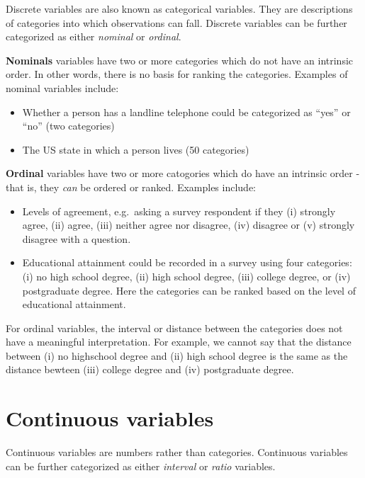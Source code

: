 \documentclass[
  12pt,
]{krantz}
\providecommand{\tightlist}{%
  \setlength{\itemsep}{0pt}\setlength{\parskip}{0pt}}
\begin{document}
Discrete variables are also known as categorical variables. They are descriptions of categories into which observations can fall. Discrete variables can be further categorized as either \emph{nominal} or \emph{ordinal}.

\textbf{Nominals} variables have two or more categories which do not have an intrinsic order. In other words, there is no basis for ranking the categories. Examples of nominal variables include:

\begin{itemize}
\tightlist
\item
  Whether a person has a landline telephone could be categorized as ``yes'' or ``no'' (two categories)
\item
  The US state in which a person lives (50 categories)
\end{itemize}

\textbf{Ordinal} variables have two or more catogories which do have an intrinsic order - that is, they \emph{can} be ordered or ranked. Examples include:

\begin{itemize}
\tightlist
\item
  Levels of agreement, e.g.~asking a survey respondent if they (i) strongly agree, (ii) agree, (iii) neither agree nor disagree, (iv) disagree or (v) strongly disagree with a question.
\item
  Educational attainment could be recorded in a survey using four categories: (i) no high school degree, (ii) high school degree, (iii) college degree, or (iv) postgraduate degree. Here the categories can be ranked based on the level of educational attainment.
\end{itemize}

For ordinal variables, the interval or distance between the categories does not have a meaningful interpretation. For example, we cannot say that the distance between (i) no highschool degree and (ii) high school degree is the same as the distance bewteen (iii) college degree and (iv) postgraduate degree.

\hypertarget{continuous-variables}{%
\section{Continuous variables}\label{continuous-variables}}

Continuous variables are numbers rather than categories. Continuous variables can be further categorized as either \emph{interval} or \emph{ratio} variables.
\end{document}
